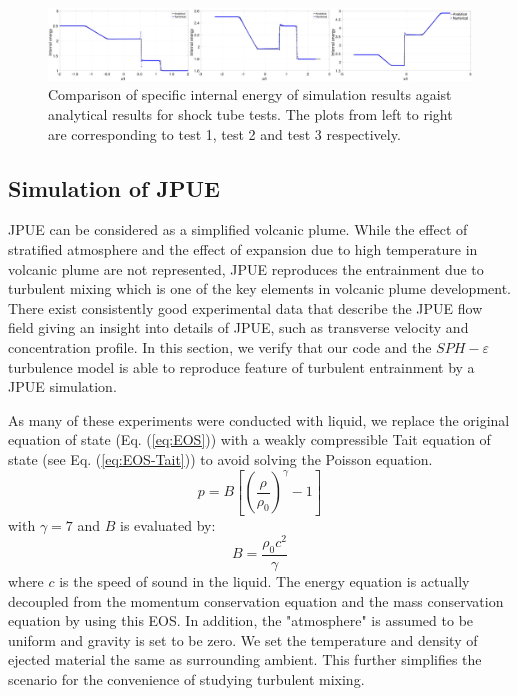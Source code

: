 \documentclass[gmd, manuscript]{copernicus}
\begin{document}
\begin{figure}[!htb]
    \centering
	  \includegraphics[width=18cm]{Fig6} 
    \caption{Comparison of specific internal energy of simulation results agaist analytical results for shock tube tests. The plots from left to right are corresponding to test 1, test 2 and test 3 respectively.}
    \label{fig:1D-shock-tests-verification}
\end{figure}

\subsection{Simulation of JPUE}
JPUE can be considered as a simplified volcanic plume. While the effect of stratified atmosphere and the effect of expansion due to high temperature in volcanic plume are not represented, JPUE reproduces the entrainment due to turbulent mixing which is one of the key elements in volcanic plume development. There exist consistently good experimental data \citep { list1982turbulent,dimotakis1983structure, papanicolaou1988investigations, ezzamel2015dynamical} that describe the JPUE flow field giving an insight into details of JPUE, such as transverse velocity and concentration profile. In this section, we verify that our code and the $SPH-\varepsilon$ turbulence model is able to reproduce feature of turbulent entrainment by a JPUE simulation.

As many of these experiments were conducted with liquid, we replace the original equation of state (Eq. (\ref{eq:EOS})) with a weakly compressible Tait equation of state \citep {becker2007weakly} (see Eq. (\ref{eq:EOS-Tait})) to avoid solving the Poisson equation.
\begin{equation}
p=B\left[\left(\dfrac{\rho}{\rho_0}\right)^{\gamma}-1\right]
\label{eq:EOS-Tait}
\end{equation}
with $\gamma=7$ and $B$ is evaluated by:
\begin{equation}
B=\dfrac{\rho_0 c^2}{\gamma}
\end{equation}
where $c$ is the speed of sound in the liquid. The energy equation is actually decoupled from the momentum conservation equation and the mass conservation equation by using this EOS. In addition, the "atmosphere" is assumed to be uniform and gravity is set to be zero. We set the temperature and density of ejected material the same as surrounding ambient. This further simplifies the scenario for the convenience of studying turbulent mixing. 
\end{document}
